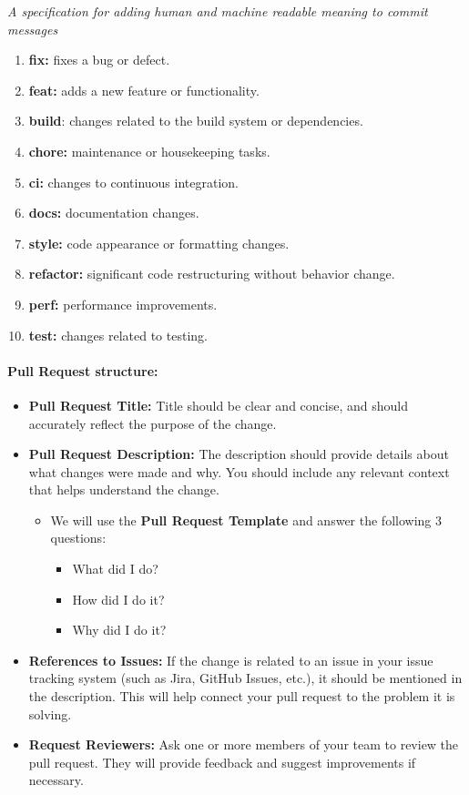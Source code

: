 \emph{A specification for adding human and machine readable meaning to
commit messages}

\begin{enumerate}
\tightlist
\item
  \textbf{fix:} fixes a bug or defect.
\item
  \textbf{feat:} adds a new feature or functionality.
\item
  \textbf{build}: changes related to the build system or dependencies.
\item
  \textbf{chore:} maintenance or housekeeping tasks.
\item
  \textbf{ci:} changes to continuous integration.
\item
  \textbf{docs:} documentation changes.
\item
  \textbf{style:} code appearance or formatting changes.
\item
  \textbf{refactor:} significant code restructuring without behavior
  change.
\item
  \textbf{perf:} performance improvements.
\item
  \textbf{test:} changes related to testing.
\end{enumerate}

\hypertarget{pullrequeststructurenbsp}{
\paragraph{Pull Request
structure:~}\label{pullrequeststructurenbsp}}

\begin{itemize}
\tightlist
\item
  \textbf{Pull Request Title:} Title should be clear and concise, and
  should accurately reflect the purpose of the change.
\item
  \textbf{Pull Request Description:} The description should provide
  details about what changes were made and why. You should include any
  relevant context that helps understand the change.

  \begin{itemize}
  \tightlist
  \item
    We will use the \textbf{Pull Request Template} and answer the
    following 3 questions:

    \begin{itemize}
    \tightlist
    \item
      What did I do?
    \item
      How did I do it?
    \item
      Why did I do it?
    \end{itemize}
  \end{itemize}
\item
  \textbf{References to Issues:} If the change is related to an issue in
  your issue tracking system (such as Jira, GitHub Issues, etc.), it
  should be mentioned in the description. This will help connect your
  pull request to the problem it is solving.
\item
  \textbf{Request Reviewers:} Ask one or more members of your team to
  review the pull request. They will provide feedback and suggest
  improvements if necessary.
\end{itemize}
